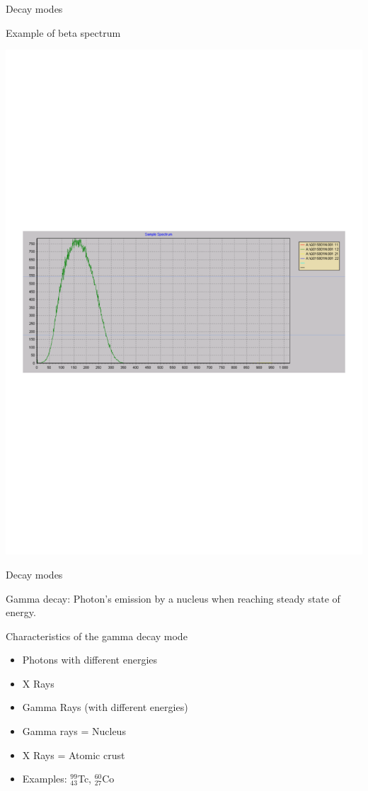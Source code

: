 \begin{frame}{Decay modes}

\alert{Example of beta spectrum}

\vskip-4cm
\centering
\includegraphics[scale=0.5]{figures/20160218_rsw_betaspectrum.pdf}

\end{frame}

\begin{frame}{Decay modes}

\alert{Gamma decay: Photon’s emission by a nucleus when reaching steady state of energy.}

\begin{exampleblock}{Characteristics of the gamma decay mode}

\begin{itemize}
\item Photons with different energies
\item X Rays 
\item Gamma Rays (with different
energies)
\item Gamma rays = Nucleus 
\item X Rays = Atomic crust
\item Examples: $^{99}_{43}$Tc, $^{60}_{27}$Co
\end{itemize}

\end{exampleblock}

\end{frame}

